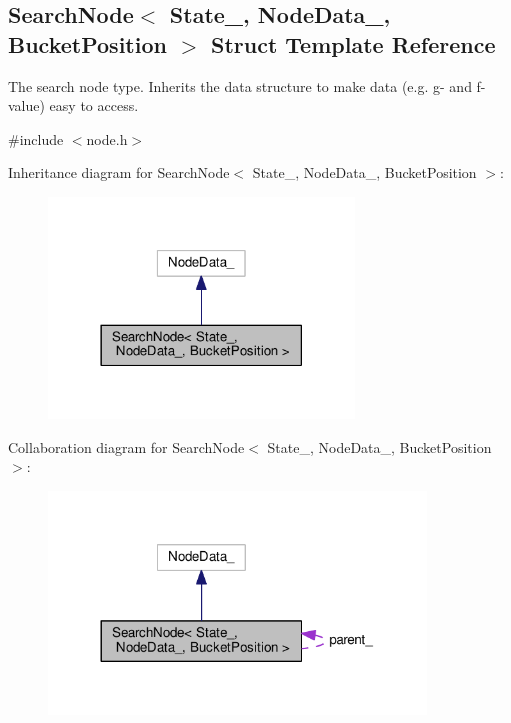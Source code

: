 \hypertarget{structSearchNode}{}\subsection{Search\+Node$<$ State\+\_\+, Node\+Data\+\_\+, Bucket\+Position $>$ Struct Template Reference}
\label{structSearchNode}


The search node type. Inherits the data structure to make data (e.\+g. g-\/ and f-\/value) easy to access.  




{\ttfamily \#include $<$node.\+h$>$}



Inheritance diagram for Search\+Node$<$ State\+\_\+, Node\+Data\+\_\+, Bucket\+Position $>$\+:\nopagebreak
\begin{figure}[H]
\begin{center}
\leavevmode
\includegraphics[width=230pt]{structSearchNode__inherit__graph}
\end{center}
\end{figure}


Collaboration diagram for Search\+Node$<$ State\+\_\+, Node\+Data\+\_\+, Bucket\+Position $>$\+:\nopagebreak
\begin{figure}[H]
\begin{center}
\leavevmode
\includegraphics[width=284pt]{structSearchNode__coll__graph}
\end{center}
\end{figure}
